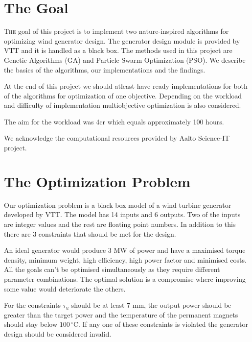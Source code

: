 \documentclass[twoside]{article}
\begin{document}
\begin{multicols}{2} %

\section{The Goal}

\lettrine[nindent=0em,lines=3]{T}{he} goal of this project is to implement two nature-inspired algorithms for optimizing wind generator design. The generator design module is provided by VTT and it is handled as a black box. The methods used in this project are Genetic Algorithms (GA) and Particle Swarm Optimization (PSO). We describe the basics of the algorithms, our implementations and the findings.

At the end of this project we should atleast have ready implementations for both of the algorithms for optimization of one objective. Depending on the workload and difficulty of implementation multiobjective optimization is also considered.

The aim for the workload was 4cr which equals approximately 100 hours.

We acknowledge the computational resources provided by Aalto Science-IT project.





\section{The Optimization Problem}
Our optimization problem is a black box model of a wind turbine generator developed by VTT. The model has 14 inputs and 6 outputs. Two of the inputs are integer values and the rest are floating point numbers. In addition to this there are 3 constraints that should be met for the design. 
	
An ideal generator would produce 3 MW of power and have a maximised torque density, minimum weight, high efficiency, high power factor and minimised costs. All the goals can't be optimised simultaneously as they require different parameter combinations. The optimal solution is a compromise where improving some value would deteriorate the others.

For the constraints $\tau_u$ should be at least 7 mm, the output power should be greater than the target power and the temperature of the permanent magnets should stay below $100\,^{\circ}\mathrm{C}$. If any one of these constraints is violated the generator design should be considered invalid.


\end{multicols}
\end{document}
